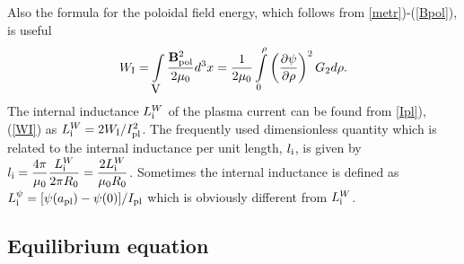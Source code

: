 Also the formula for the poloidal field energy, which follows from 
\eqs\ref{metr})-(\ref{Bpol}), is useful 
\begin{equation}
\label{WI}
W_{\rm I}
=\int\limits_{\mbox{\cal V}}\frac{{\bf B}_{\rm pol}^2}{2\mu_0}d^3x
=\frac{1}{2\mu_0}\int\limits_0^\rho 
\left(\displaystyle{\partial \psi\over\partial \rho}\right)^2 G_2 d\rho
.\end{equation}
The internal inductance $L_{\rm i}^W$ of the plasma current can be found
from \eqs \ref{Ipl}), (\ref{WI}) as 
$L_{\rm i}^W=2W_{\rm I}/I_{\rm pl}^2$. 
The frequently used dimensionless quantity which is related to the
internal inductance per unit length, $l_{\rm i}$, is given by $l_{\rm
i}=\displaystyle\frac{4\pi}{\mu_0}\frac{L_{\rm i}^W}{2\pi R_0}=\frac{2L_{\rm
i}^W}{\mu_0 R_0}$. 
Sometimes the internal inductance is defined as ${L_{\rm
i}^\psi=[\psi(a_{\rm pl})-\psi(0)]/I_{\rm pl}}$ which is obviously
different from $L_{\rm i}^W$. 

\subsection{Equilibrium equation}

